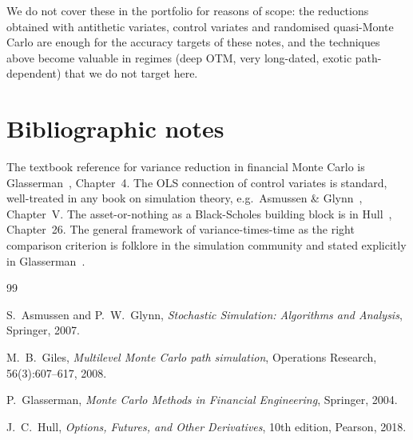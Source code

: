 \documentclass[11pt,a4paper]{article}
\theoremstyle{plain}
\theoremstyle{definition}
\theoremstyle{remark}
\begin{document}
We do not cover these in the portfolio for reasons of scope: the
reductions obtained with antithetic variates, control variates and
randomised quasi-Monte Carlo are enough for the accuracy targets of
these notes, and the techniques above become valuable in regimes (deep OTM, very long-dated, exotic
path-dependent) that we do not target here.

\section{Bibliographic notes}
\label{sec:biblio}

The textbook reference for variance reduction in financial Monte
Carlo is Glasserman~\cite{Glasserman}, Chapter~4. The OLS connection
of control variates is standard, well-treated in any book on
simulation theory, e.g.\ Asmussen \& Glynn~\cite{AsmussenGlynn},
Chapter~V. The asset-or-nothing as a Black-Scholes building block is
in Hull~\cite{Hull}, Chapter~26. The general framework of
variance-times-time as the right comparison criterion is
folklore in the simulation community and stated explicitly in
Glasserman~\cite[Section~1.1.3]{Glasserman}.

\begin{thebibliography}{99}

S.\ Asmussen and P.\ W.\ Glynn,
\emph{Stochastic Simulation: Algorithms and Analysis},
Springer, 2007.

M.\ B.\ Giles,
\emph{Multilevel Monte Carlo path simulation},
Operations Research, 56(3):607--617, 2008.

P.\ Glasserman,
\emph{Monte Carlo Methods in Financial Engineering},
Springer, 2004.

J.\ C.\ Hull,
\emph{Options, Futures, and Other Derivatives},
10th edition, Pearson, 2018.

\end{thebibliography}
\end{document}
